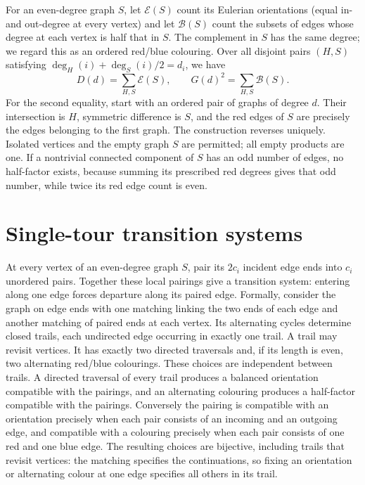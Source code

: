 \documentclass[11pt]{article}
\theoremstyle{remark}\newtheorem{remark}[theorem]{Remark}
\newcommand{\EO}{\mathcal E}
\newcommand{\HF}{\mathcal B}
\begin{document}
For an even-degree graph $S$, let $\EO(S)$ count its Eulerian orientations (equal in- and out-degree at every vertex) and let $\HF(S)$ count the subsets of edges whose degree at each vertex is half that in $S$. The complement in $S$ has the same degree; we regard this as an ordered red/blue colouring. Over all disjoint pairs $(H,S)$ satisfying $\deg_H(i)+\deg_S(i)/2=d_i$, we have
\begin{equation}\label{eq:decomposition}
 D(d)=\sum_{H,S}\EO(S),\qquad G(d)^2=\sum_{H,S}\HF(S).
\end{equation}
For the second equality, start with an ordered pair of graphs of degree $d$. Their intersection is $H$, symmetric difference is $S$, and the red edges of $S$ are precisely the edges belonging to the first graph. The construction reverses uniquely. Isolated vertices and the empty graph $S$ are permitted; all empty products are one. If a nontrivial connected component of $S$ has an odd number of edges, no half-factor exists, because summing its prescribed red degrees gives that odd number, while twice its red edge count is even.

\section{Single-tour transition systems}\label{sec:tours}
At every vertex of an even-degree graph $S$, pair its $2c_i$ incident edge ends into $c_i$ unordered pairs. Together these local pairings give a transition system: entering along one edge forces departure along its paired edge. Formally, consider the graph on edge ends with one matching linking the two ends of each edge and another matching of paired ends at each vertex. Its alternating cycles determine closed trails, each undirected edge occurring in exactly one trail. A trail may revisit vertices. It has exactly two directed traversals and, if its length is even, two alternating red/blue colourings. These choices are independent between trails. A directed traversal of every trail produces a balanced orientation compatible with the pairings, and an alternating colouring produces a half-factor compatible with the pairings. Conversely the pairing is compatible with an orientation precisely when each pair consists of an incoming and an outgoing edge, and compatible with a colouring precisely when each pair consists of one red and one blue edge. The resulting choices are bijective, including trails that revisit vertices: the matching specifies the continuations, so fixing an orientation or alternating colour at one edge specifies all others in its trail.
\end{document}
